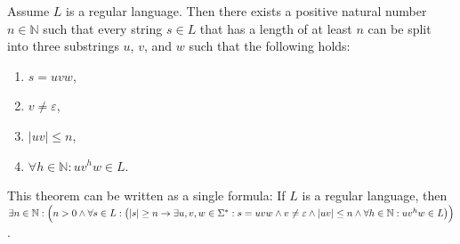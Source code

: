 \begin{Theorem} \lb
   
  Assume $L$ is a regular language.  Then there exists a positive natural number $n \in \mathbb{N}$ such that
  every string $s \in L$ that has a length of at least $n$ can be split into three substrings $u$,
  $v$, and $w$ such that the following holds:
  \begin{enumerate}
  \item $s= uvw$,
  \item $v \not= \varepsilon$,
  \item $|uv| \leq n$,
  \item $\forall h \in \mathbb{N}: uv^hw \in L$.
  \end{enumerate}
  This theorem can be written as a single formula:  If $L$ is a regular language, then 
  \\[0.2cm]
  \hspace*{0.3cm}
  $\exists n \in \mathbb{N}:\Bigl(n > 0 \wedge \forall s \in L : \bigl(|s| \geq n \rightarrow \exists u,v,w\in \Sigma^* :
   s = uvw \wedge v \not= \varepsilon \wedge |uv| \leq n \wedge 
    \forall h \in \mathbb{N}: uv^h w \in L
   \bigr)\Bigr)
  $.
\end{Theorem}

